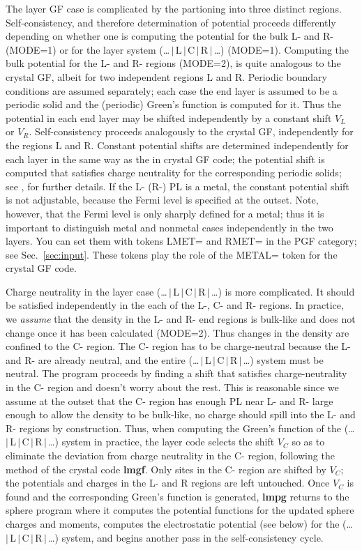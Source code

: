\documentclass{article}
\begin{document}
The layer GF case is complicated by the partioning into three
distinct regions.  Self-consistency, and therefore determination
of potential proceeds differently depending on whether one is
computing the potential for the bulk L- and R- (MODE=1) or for
the layer system (\dots\,$|$\,L\,$|$\,C\,$|$\,R\,$|$\,\dots)
(MODE=1).
Computing the bulk potential for the L- and R- regions (MODE=2),
is quite analogous to the crystal GF, albeit for two independent
regions L and R.  Periodic boundary conditions are assumed
separately; each case the end layer is assumed to be a periodic
solid and the (periodic) Green's function is computed for it.
Thus the potential in each end layer may be shifted independently
by a constant shift $V_L$ or $V_R$.  Self-consistency proceeds
analogously to the crystal GF, independently for the regions L
and R.  Constant potential shifts are determined independently
for each layer in the same way as the in crystal GF code; the
potential shift is computed that satisfies charge neutrality for
the corresponding periodic solids; see , for further details.  If the L- (R-) PL
is a metal, the constant potential shift is not adjustable,
because the Fermi level is specified at the outset.  Note,
however, that the Fermi level is only sharply defined for a
metal; thus it is important to distinguish metal and nonmetal
cases independently in the two layers.  You can set them with
tokens LMET= and RMET= in the PGF category; see
Sec.~\ref{sec:input}.  These tokens play the role of the METAL=
token for the crystal GF code.

Charge neutrality in the layer case
(\dots\,$|$\,L\,$|$\,C\,$|$\,R\,$|$\,\dots) is more complicated.
It should be satisfied independently in the each of the L-, C-
and R- regions.  In practice, we {\em assume} that the density in
the L- and R- end regions is bulk-like and does not change once
it has been calculated (MODE=2).  Thus changes in the density are
confined to the C- region.  The C- region has to be
charge-neutral because the L- and R- are already neutral, and the
entire (\dots\,$|$\,L\,$|$\,C\,$|$\,R\,$|$\,\dots) system must be
neutral.  The program proceeds by finding a shift that satisfies
charge-neutrality in the C- region and doesn't worry about the
rest.  This is reasonable since we assume at the outset that the
C- region has enough PL near L- and R- large enough to allow the
density to be bulk-like, no charge should spill into the L- and
R- regions by construction.  Thus, when computing the Green's
function of the (\dots\,$|$\,L\,$|$\,C\,$|$\,R\,$|$\,\dots)
system in practice, the layer code selects the shift $V_C$ so as
to eliminate the deviation from charge neutrality in the C-
region, following the method of the crystal code {\bf lmgf}.
Only sites in the C- region are shifted by $V_C$; the potentials
and charges in the L- and R regions are left untouched.  Once
$V_C$ is found and the corresponding Green's function is
generated, {\bf lmpg} returns to the sphere program where it
computes the potential functions for the updated sphere charges
and moments, computes the electrostatic potential (see below)
for the (\dots\,$|$\,L\,$|$\,C\,$|$\,R\,$|$\,\dots) system, and
begins another pass in the self-consistency cycle.
\end{document}
